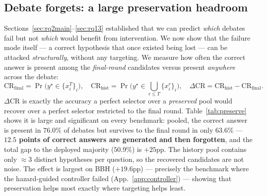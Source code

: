 
\subsection{Debate forgets: a large preservation headroom}
\label{sec:preserve}

Sections~\ref{sec:rq2main}--\ref{sec:rq13} established that we can predict \emph{which} debates fail but
not \emph{which} would benefit from intervention. We now show that the failure mode itself --- a
correct hypothesis that once existed being lost --- can be attacked \emph{structurally}, without any
targeting. We measure how often the correct answer is present among the \emph{final-round} candidates
versus present \emph{anywhere} across the debate:
\begin{equation}
\mathrm{CR}_{\mathrm{final}} = \Pr\!\big(y^\star \in \{x_i^{T}\}_i\big),\quad
\mathrm{CR}_{\mathrm{hist}} = \Pr\!\big(y^\star \in \textstyle\bigcup_{r\le T}\{x_i^{r}\}_i\big),\quad
\Delta\mathrm{CR}=\mathrm{CR}_{\mathrm{hist}}-\mathrm{CR}_{\mathrm{final}} .
\end{equation}
$\Delta\mathrm{CR}$ is exactly the accuracy a perfect selector over a \emph{preserved} pool would
recover over a perfect selector restricted to the final round. Table~\ref{tab:preserve} shows it is
large and significant on every benchmark: pooled, the correct answer is present in $76.0\%$ of debates
but survives to the final round in only $63.6\%$ --- \textbf{$12.5$ points of correct answers are
generated and then forgotten}, and the total gap to the deployed majority ($50.9\%$) is $+25$pp. The
history pool contains only $\approx 3$ distinct hypotheses per question, so the recovered candidates
are not noise. The effect is largest on BBH ($+19.6$pp) --- precisely the benchmark where the
hazard-guided controller failed (App.~\ref{app:controller}) --- showing that preservation helps most exactly
where targeting helps least.

